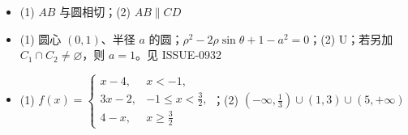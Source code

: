 \begin{itemize}[leftmargin=2.6em]
  \item[\textbf{22.}] (1) \(AB\) 与圆相切；(2) \(AB\parallel CD\)
  \item[\textbf{23.}] (1) 圆心 \((0,1)\)、半径 \(a\) 的圆；\(\rho^2-2\rho\sin\theta+1-a^2=0\)；(2) U；若另加 \(C_1\cap C_2\ne\varnothing\)，则 \(a=1\)。见 ISSUE-0932
  \item[\textbf{24.}] (1) $f(x)=\begin{cases}x-4,&x<-1,\\3x-2,&-1\le x<\frac32,\\4-x,&x\ge\frac32\end{cases}$；(2) \((-\infty,\frac13)\cup(1,3)\cup(5,+\infty)\)
\end{itemize}
